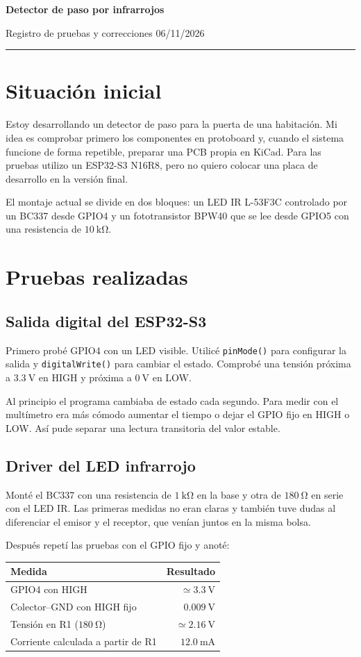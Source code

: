 \documentclass[10pt,a4paper]{article}
\newcommand{\titular}[2]{%
  {\LARGE\bfseries #1\par}
  \vspace{0.45em}
  {\normalsize #2\par}
  \vspace{0.45em}\hrule\vspace{0.9em}
}
\begin{document}
\titular{Detector de paso por infrarrojos}{Registro de pruebas y correcciones \hfill 06/11/2026}

\section{Situación inicial}
Estoy desarrollando un detector de paso para la puerta de una habitación. Mi idea es comprobar primero los componentes en protoboard y, cuando el sistema funcione de forma repetible, preparar una PCB propia en KiCad. Para las pruebas utilizo un ESP32-S3 N16R8, pero no quiero colocar una placa de desarrollo en la versión final.

El montaje actual se divide en dos bloques: un LED IR L-53F3C controlado por un BC337 desde GPIO4 y un fototransistor BPW40 que se lee desde GPIO5 con una resistencia de $\SI{10}{\kilo\ohm}$.

\section{Pruebas realizadas}
\subsection{Salida digital del ESP32-S3}
Primero probé GPIO4 con un LED visible. Utilicé \texttt{pinMode()} para configurar la salida y \texttt{digitalWrite()} para cambiar el estado. Comprobé una tensión próxima a $\SI{3.3}{\volt}$ en HIGH y próxima a $\SI{0}{\volt}$ en LOW.

Al principio el programa cambiaba de estado cada segundo. Para medir con el multímetro era más cómodo aumentar el tiempo o dejar el GPIO fijo en HIGH o LOW. Así pude separar una lectura transitoria del valor estable.

\subsection{Driver del LED infrarrojo}
Monté el BC337 con una resistencia de $\SI{1}{\kilo\ohm}$ en la base y otra de $\SI{180}{\ohm}$ en serie con el LED IR. Las primeras medidas no eran claras y también tuve dudas al diferenciar el emisor y el receptor, que venían juntos en la misma bolsa.

Después repetí las pruebas con el GPIO fijo y anoté:
\begin{center}
\begin{tabularx}{\linewidth}{@{}X r@{}}
\toprule
Medida & Resultado\\
\midrule
GPIO4 con HIGH & $\simeq\SI{3.3}{\volt}$\\
Colector--GND con HIGH fijo & $\SI{0.009}{\volt}$\\
Tensión en R1 ($\SI{180}{\ohm}$) & $\simeq\SI{2.16}{\volt}$\\
Corriente calculada a partir de R1 & $\SI{12.0}{\milli\ampere}$\\
\bottomrule
\end{tabularx}
\end{center}
\end{document}
